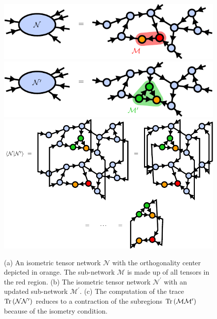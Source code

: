 \begin{figure}
	\centering
	\subcaptionbox{\label{fig:isometric_tensor_network_N}}
	{%
		\includegraphics[scale=1]{figures/tikz/Tensor_Networks/contractions_of_isometric_tensor_networks/contractions_of_isometric_tensor_networks_a.pdf}
	}
	\subcaptionbox{\label{fig:isometric_tensor_network_N_prime}}
	{%
		\includegraphics[scale=1]{figures/tikz/Tensor_Networks/contractions_of_isometric_tensor_networks/contractions_of_isometric_tensor_networks_b.pdf}
	}
	\subcaptionbox{\label{fig:isometric_tensor_network_norm_contraction}}
	{%
		\includegraphics[scale=1]{figures/tikz/Tensor_Networks/contractions_of_isometric_tensor_networks/contractions_of_isometric_tensor_networks_c.pdf}
	}
	\caption{(a) An isometric tensor network $\mathcal{N}$ with the orthogonality center depicted in orange. The sub-network $\mathcal{M}$ is made up of all tensors in the red region. (b) The isometric tensor network $\mathcal{N}^\prime$ with an updated sub-network $\mathcal{M}^\prime$. (c) The computation of the trace $\operatorname{Tr}\left(\mathcal{N}\mathcal{N}^\prime\right)$ reduces to a contraction of the subregions $\operatorname{Tr}\left(\mathcal{M}\mathcal{M}^\prime\right)$ because of the isometry condition.}
	\label{fig:isometric_tensor_network_local_approximation}
\end{figure}